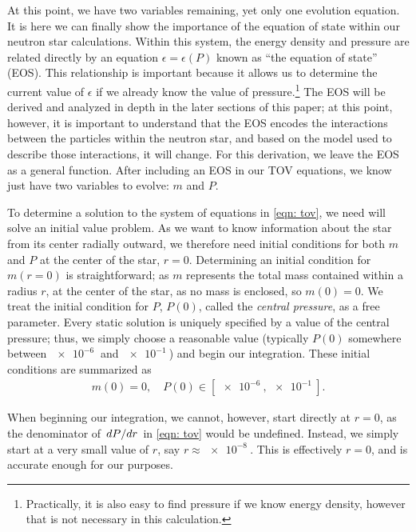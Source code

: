 At this point, we have two variables remaining, yet only one evolution equation. It is here we can finally show the importance of the equation of state within our neutron star calculations. Within this system, the energy density and pressure are related directly by an equation $\epsilon = \epsilon(P)$ known as ``the equation of state'' (EOS). This relationship is important because it allows us to determine the current value of $\epsilon$ if we already know the value of pressure.\footnote{ Practically, it is also easy to find pressure if we know energy density, however that is not necessary in this calculation.} The EOS will be derived and analyzed in depth in the later sections of this paper; at this point, however, it is important to understand that the EOS encodes the interactions between the particles within the neutron star, and based on the model used to describe those interactions, it will change. For this derivation, we leave the EOS as a general function. After including an EOS in our TOV equations, we know just have two variables to evolve: $m$ and $P$.

To determine a solution to the system of equations in \eqref{eqn: tov}, we need will solve an initial value problem. As we want to know information about the star from its center radially outward, we therefore need initial conditions for both $m$ and $P$ at the center of the star, $r=0$. Determining an initial condition for $m(r=0)$ is straightforward; as $m$ represents the total mass contained within a radius $r$, at the center of the star, as no mass is enclosed, so $m(0)=0$. We treat the initial condition for $P$, $P(0)$, called the \textit{central pressure}, as a free parameter. Every static solution is uniquely specified by a value of the central pressure; thus, we simply choose a reasonable value (typically $P(0)$ somewhere between $\SI{e-6}{}$ and $\SI{e-1}{}$) and begin our integration. These initial conditions are summarized as
\begin{align}\label{eqn: tov ic}
    m(0) = 0, \quad P(0) \in [\SI{e-6}{}, \SI{e-1}{}].
\end{align}

When beginning our integration, we cannot, however, start directly at $r=0$, as the denominator of $\dv*{P}{r}$ in \eqref{eqn: tov} would be undefined. Instead, we simply start at a very small value of $r$, say $r\approx\SI{e-8}{}$. This is effectively $r=0$, and is accurate enough for our purposes.

